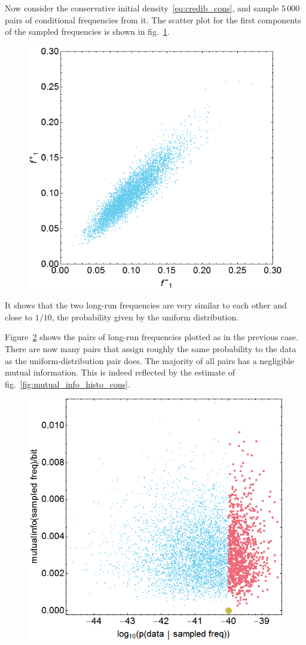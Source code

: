 \documentclass[\ifafour a4paper,12pt,\else a5paper,10pt,\fi%
onecolumn,oneside,article,%
british%
]{memoir}
\theoremstyle{remark}
\theoremstyle{innote}
\renewcommand*{\|}{\nonscript\,\vert\nonscript\;\mathopen{}}
\newcommand*{\fig}{fig.}%
\begin{document}
\medskip

Now consider the conservative initial density~\eqref{eq:credib_cons}, and
sample $5\,000$ pairs of conditional frequencies from it. The scatter plot
for the first components of the sampled frequencies is shown in
\fig~\ref{fig:f1_cons}.
\begin{figure}[h!]
\centering\includegraphics[width=0.5\linewidth]{B_sample_f1.png}\\
\caption{}\label{fig:f1_cons}
\end{figure}%
It shows that the two long-run frequencies are very similar to each other and close
to $1/10$, the probability given by the uniform distribution.


Figure~\ref{fig:init_scatter_cons} shows the pairs of long-run frequencies
plotted as in the previous case. There are now many pairs that assign
roughly the same probability to the data as the uniform-distribution pair
does. The majority of all pairs has a negligible mutual information. This
is indeed reflected by the estimate of
\fig~\ref{fig:mutual_info_histo_cons}.
\begin{figure}[b!]
\centering\includegraphics[width=0.75\linewidth]{B_init_scatter.png}\\
\caption{}\label{fig:init_scatter_cons}
\end{figure}%
\end{document}

